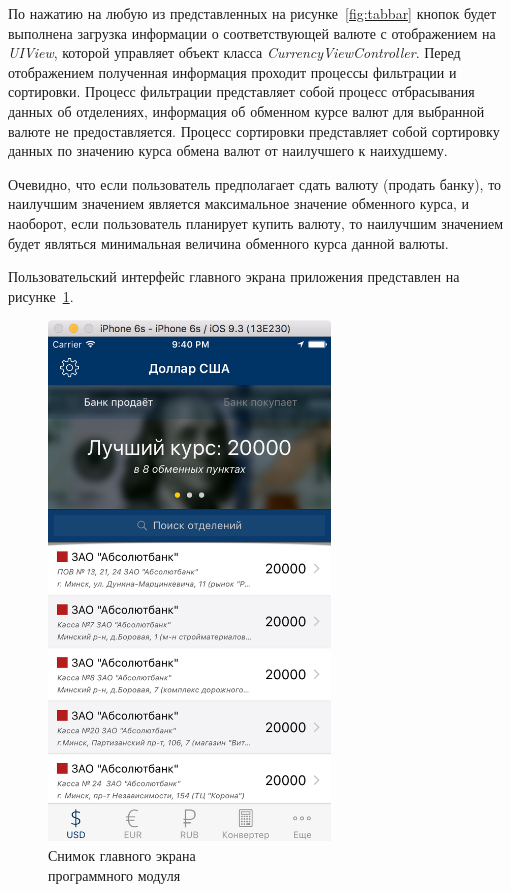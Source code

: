 По нажатию на любую из представленных на рисунке~\ref{fig:tabbar} кнопок будет
выполнена загрузка информации о соответствующей валюте с отображением
на \textit{UIView}, которой управляет объект класса \textit{CurrencyViewController}.
Перед отображением полученная информация проходит процессы фильтрации
и сортировки. Процесс фильтрации представляет собой процесс отбрасывания
данных об отделениях, информация об обменном курсе валют для выбранной валюте не
предоставляется. Процесс сортировки представляет собой сортировку данных
по значению курса обмена валют от наилучшего к наихудшему.

Очевидно, что если пользователь предполагает сдать
валюту (продать банку), то наилучшим значением
является максимальное значение обменного курса, и наоборот, если пользователь
планирует купить валюту, то наилучшим значением будет являться минимальная
величина обменного курса данной валюты.

Пользовательский интерфейс главного экрана приложения представлен на
рисунке~\ref{fig:main_screen}.
\begin{figure}[h!]
  \centering
  \includegraphics[width=75mm]{fig/main_screen}
  \caption{Снимок главного экрана \\ программного модуля}
  \label{fig:main_screen}
\end{figure}

